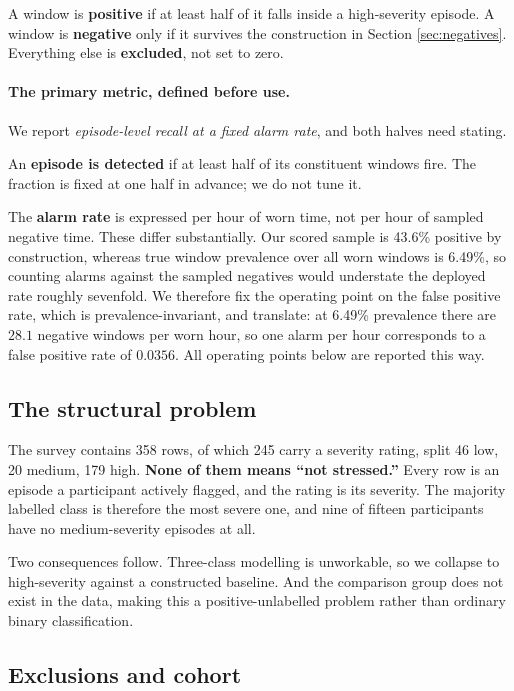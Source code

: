 \documentclass{article}
\begin{document}
A window is \textbf{positive} if at least half of it falls inside a
high-severity episode. A window is \textbf{negative} only if it survives the
construction in Section \ref{sec:negatives}. Everything else is
\textbf{excluded}, not set to zero.

\paragraph{The primary metric, defined before use.} We report
\emph{episode-level recall at a fixed alarm rate}, and both halves need
stating.

An \textbf{episode is detected} if at least half of its constituent windows
fire. The fraction is fixed at one half in advance; we do not tune it.

The \textbf{alarm rate} is expressed per hour of worn time, not per hour of
sampled negative time. These differ substantially. Our scored sample is
43.6\% positive by construction, whereas true window prevalence
over all worn windows is 6.49\%, so counting alarms against the
sampled negatives would understate the deployed rate roughly sevenfold. We
therefore fix the operating point on the false positive rate, which is
prevalence-invariant, and translate: at 6.49\% prevalence there
are $28.1$ negative windows per worn hour, so one alarm per hour corresponds to
a false positive rate of $0.0356$. All operating points below are reported this
way.

\subsection{The structural problem}

The survey contains 358 rows, of which 245 carry a severity rating, split 46
low, 20 medium, 179 high. \textbf{None of them means ``not stressed.''} Every
row is an episode a participant actively flagged, and the rating is its
severity. The majority labelled class is therefore the most severe one, and
nine of fifteen participants have no medium-severity episodes at all.

Two consequences follow. Three-class modelling is unworkable, so we collapse to
high-severity against a constructed baseline. And the comparison group does not
exist in the data, making this a positive-unlabelled problem \cite{elkan2008}
rather than ordinary binary classification.

\subsection{Exclusions and cohort}
\end{document}
